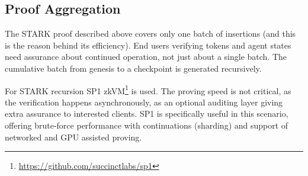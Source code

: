 \subsection{Proof Aggregation}

The STARK proof described above covers only one batch of insertions (and this is the reason behind its efficiency). End users verifying tokens and agent states need assurance about continued operation, not just about a single batch. The cumulative batch from genesis to a checkpoint is generated recursively.

For STARK recursion SP1 zkVM\footnote{\url{https://github.com/succinctlabs/sp1}} is used. The proving speed is not critical, as the verification happens asynchronously, as an optional auditing layer giving extra assurance to interested clients. SP1 is specifically useful in this scenario, offering brute-force performance with continuations (sharding) and support of networked and GPU assisted proving.
